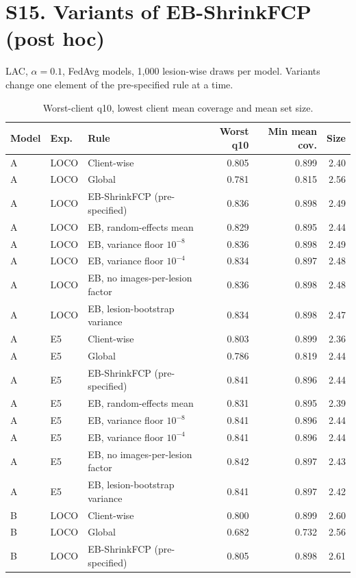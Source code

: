 \documentclass[10pt]{article}
\begin{document}
\section*{S15. Variants of EB-ShrinkFCP (post hoc)}
LAC, $\alpha=0.1$, FedAvg models, 1,000 lesion-wise draws per model. Variants change one element of the pre-specified rule at a time.
\begin{table}[!htbp]
\centering
\scriptsize
\caption{Worst-client q10, lowest client mean coverage and mean set size.}
\label{tab:s15}
\begin{tabular}{@{}lllrrr@{}}
\toprule
Model & Exp. & Rule & Worst q10 & Min mean cov. & Size \\
\midrule
A & LOCO & Client-wise & 0.805 & 0.899 & 2.40 \\
A & LOCO & Global & 0.781 & 0.815 & 2.56 \\
A & LOCO & EB-ShrinkFCP (pre-specified) & 0.836 & 0.898 & 2.49 \\
A & LOCO & EB, random-effects mean & 0.829 & 0.895 & 2.44 \\
A & LOCO & EB, variance floor $10^{-8}$ & 0.836 & 0.898 & 2.49 \\
A & LOCO & EB, variance floor $10^{-4}$ & 0.834 & 0.897 & 2.48 \\
A & LOCO & EB, no images-per-lesion factor & 0.836 & 0.898 & 2.48 \\
A & LOCO & EB, lesion-bootstrap variance & 0.834 & 0.898 & 2.47 \\
\midrule
A & E5 & Client-wise & 0.803 & 0.899 & 2.36 \\
A & E5 & Global & 0.786 & 0.819 & 2.44 \\
A & E5 & EB-ShrinkFCP (pre-specified) & 0.841 & 0.896 & 2.44 \\
A & E5 & EB, random-effects mean & 0.831 & 0.895 & 2.39 \\
A & E5 & EB, variance floor $10^{-8}$ & 0.841 & 0.896 & 2.44 \\
A & E5 & EB, variance floor $10^{-4}$ & 0.841 & 0.896 & 2.44 \\
A & E5 & EB, no images-per-lesion factor & 0.842 & 0.897 & 2.43 \\
A & E5 & EB, lesion-bootstrap variance & 0.841 & 0.897 & 2.42 \\
\midrule
B & LOCO & Client-wise & 0.800 & 0.899 & 2.60 \\
B & LOCO & Global & 0.682 & 0.732 & 2.56 \\
B & LOCO & EB-ShrinkFCP (pre-specified) & 0.805 & 0.898 & 2.61 \\

\end{tabular}
\end{table}
\end{document}
